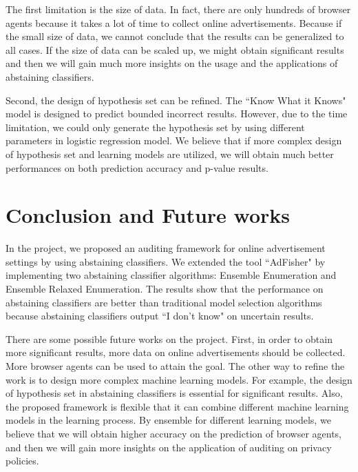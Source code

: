 \documentclass[12pt, journal]{IEEEtran}
\begin{document}
The first limitation is the size of data. In fact, there are only hundreds of browser agents because it takes a lot of time to collect online advertisements.
Because if the small size of data, we cannot conclude that the results can be generalized to all cases.
If the size of data can be scaled up, we might obtain significant results and then we will gain much more insights on the usage and the applications of abstaining classifiers.

Second, the design of hypothesis set can be refined. 
The ``Know What it Knows" model is designed to predict bounded incorrect results.
However, due to the time limitation, we could only generate the hypothesis set by using different parameters in logistic regression model.
We believe that if more complex design of hypothesis set and learning models are utilized, we will obtain much better performances on both prediction accuracy and p-value results. 
\section{Conclusion and Future works}
In the project, we proposed an auditing framework for online advertisement settings by using abstaining classifiers.
We extended the tool ``AdFisher" by implementing two abstaining classifier algorithms: Ensemble Enumeration and Ensemble Relaxed Enumeration.
The results show that the performance on abstaining classifiers are better than traditional model selection algorithms because abstaining classifiers output ``I don't know" on uncertain results.

There are some possible future works on the project.
First, in order to obtain more significant results, more data on online advertisements should be collected.
More browser agents can be used to attain the goal.
The other way to refine the work is to design more complex machine learning models.
For example, the design of hypothesis set in abstaining classifiers is essential for significant results.
Also, the proposed framework is flexible that it can combine different machine learning models in the learning process.
By ensemble for different learning models, we believe that we will obtain higher accuracy on the prediction of browser agents, and then we will gain more insights on the application of auditing on privacy policies.  

\end{document}
